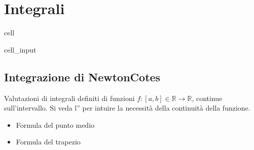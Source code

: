 \documentclass[letterpaper,10pt,italian]{jupyterBook}
\begin{document}
\chapter{Integrali}
\label{\detokenize{ch/numerics/integrals:integrali}}\label{\detokenize{ch/numerics/integrals::doc}}
\begin{sphinxuseclass}{cell}\begin{sphinxVerbatimInput}

\begin{sphinxuseclass}{cell_input}
\begin{sphinxVerbatim}[commandchars=\\\{\}]

   
\end{sphinxVerbatim}

\end{sphinxuseclass}\end{sphinxVerbatimInput}

\end{sphinxuseclass}

\section{Integrazione di Newton\sphinxhyphen{}Cotes}
\label{\detokenize{ch/numerics/integrals:integrazione-di-newton-cotes}}
\sphinxAtStartPar
Valutazioni di integrali definiti di funzioni \(f: [a,b] \in \mathbb{R} \rightarrow \mathbb{R}\), continue sull’intervallo. Si veda l”{\hyperref[\detokenize{ch/numerics/integrals:integrals-examples-continuity}]{}} per intuire la necessità della continuità della funzione.
\begin{itemize}
\item {} 
\sphinxAtStartPar
Formula del punto medio

\item {} 
\sphinxAtStartPar
Formula del trapezio

\end{itemize}
\end{document}
